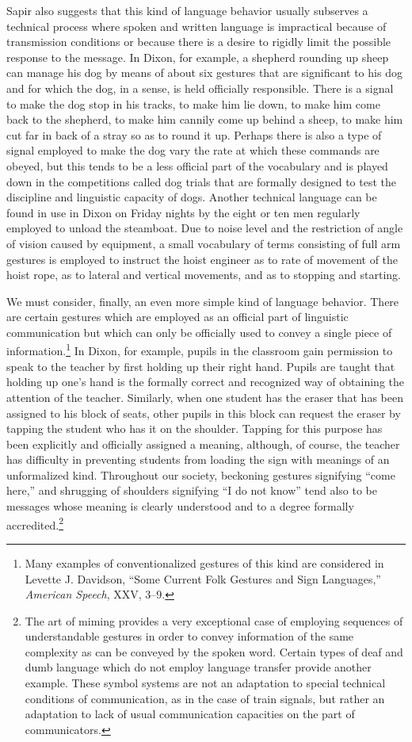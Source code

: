 \documentclass[openany,nobib]{tufte-book}
\begin{document}
\noindent Sapir also suggests that this kind of language behavior usually
subserves a technical process where spoken and written language is
impractical because of transmission conditions or because there is a
desire to rigidly limit the possible response to the message. In Dixon,
for example, a shepherd rounding up sheep can manage his dog by means of
about six gestures that are significant to his dog and for which the
dog, in a sense, is held officially responsible. There is a signal to
make the dog stop in his tracks, to make him lie down, to make him come
back to the shepherd, to make him cannily come up behind a sheep, to
make him cut far in back of a stray so as to round it up. Perhaps there
is also a type of signal employed to make the dog vary the rate at which
these commands are obeyed, but this tends to be a less official part of
the vocabulary and is played down in the competitions called dog trials
that are formally designed to test the discipline and linguistic
capacity of dogs. Another technical language can be found in use in
Dixon on Friday nights by the eight or ten men regularly employed to
unload the steamboat. Due to noise level and the restriction of angle of
vision caused by equipment, a small vocabulary of terms consisting of
full arm gestures is employed to instruct the hoist engineer as to rate
of movement of the hoist rope, as to lateral and vertical movements, and
as to stopping and starting.

We must consider, finally, an even more simple kind of language
behavior. There are certain gestures which are employed as an official
part of linguistic communication but which can only be officially used
to convey a single piece of information.\footnote{Many examples of
  conventionalized gestures of this kind are considered in Levette J.
  Davidson, ``Some Current Folk Gestures and Sign Languages,''
  \emph{American Speech}, XXV, 3--9.} In Dixon, for example, pupils in
the classroom gain permission to speak to the teacher by first holding
up their right hand. Pupils are taught that holding up one's hand is the
formally correct and recognized way of obtaining the attention of the
teacher. Similarly, when one student has the eraser that has been
assigned to his block of seats, other pupils in this block can request
the eraser by tapping the student who has it on the shoulder. Tapping
for this purpose has been explicitly and officially assigned a meaning,
although, of course, the teacher has difficulty in preventing students
from loading the sign with meanings of an unformalized kind. Throughout
our society, beckoning gestures signifying ``come here,'' and shrugging
of shoulders signifying ``I do not know'' tend also to be messages whose
meaning is clearly understood and to a degree formally
accredited.\footnote{The art of miming provides a very exceptional case
  of employing sequences of understandable gestures in order to convey
  information of the same complexity as can be conveyed by the spoken
  word. Certain types of deaf and dumb language which do not employ
  language transfer provide another example. These symbol systems are
  not an adaptation to special technical conditions of communication, as
  in the case of train signals, but rather an adaptation to lack of
  usual communication capacities on the part of communicators.}
\end{document}
